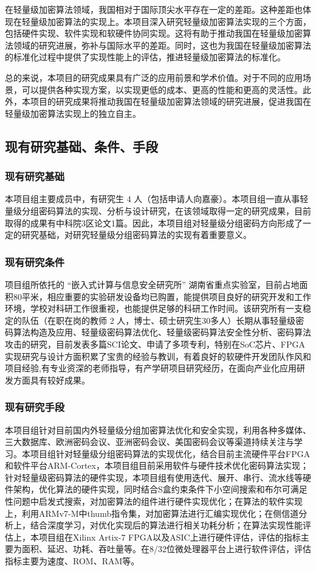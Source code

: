 \documentclass{ctexart}
\begin{document}
在轻量级加密算法领域，我国相对于国际顶尖水平存在一定的差距。这种差距也体现在轻量级加密算法的实现上。本项目深入研究轻量级加密算法实现的三个方面，包括硬件实现、软件实现和软硬件协同实现。这将有助于推动我国在轻量级加密算法领域的研究进展，弥补与国际水平的差距。同时，这也为我国在轻量级加密算法的标准化过程中提供了实现性能上的评估，推进轻量级加密算法的标准化。

总的来说，本项目的研究成果具有广泛的应用前景和学术价值。对于不同的应用场景，可以提供各种实现方案，以实现更低的成本、更高的性能和更高的灵活性。此外，本项目的研究成果将推动我国在轻量级加密算法领域的研究进展，促进我国在轻量级加密算法实现上的独立自主。

\subsection{现有研究基础、条件、手段}
\subsubsection{现有研究基础}
本项目组主要成员中，有研究生 4 人（包括申请人向嘉豪）。本项目组一直从事轻量级分组密码算法的实现、分析与设计研究，在该领域取得一定的研究成果，目前取得的成果有中科院3区论文1篇。因此，本项目组对轻量级分组密码方向形成了一定的研究基础，对研究轻量级分组密码算法的实现有着重要意义。
\subsubsection{现有研究条件}
项目组所依托的 “嵌入式计算与信息安全研究所” 湖南省重点实验室，目前占地面积80平米，相应重要的实验研发设备均已购置，能提供项目良好的研究开发和工作环境，学校对科研工作很重视，也能提供足够的科研工作时间。该研究所有一支稳定的队伍（在职在岗的教师 2 人，博士、硕士研究生30多人）长期从事轻量级密码算法构造及应用、轻量级密码算法优化、轻量级密码算法安全性分析、密码算法攻击的研究，目前发表多篇SCI论文、申请了多项专利，特别在SoC芯片、FPGA实现研究与设计方面积累了宝贵的经验与教训，有着良好的软硬件开发团队作风和项目经验,有专业资深的老师指导，有产学研项目研究经历，在面向产业化应用研发方面具有较好成果。

\subsubsection{现有研究手段}

本项目组针对目前国内外轻量级分组加密算法优化和安全实现，利用各种多媒体、三大数据库、欧洲密码会议、亚洲密码会议、美国密码会议等渠道持续关注与学习。本项目组针对轻量级分组密码算法的实现优化，结合目前主流硬件平台FPGA和软件平台ARM-Cortex，本项目组目前采用软件与硬件技术优化密码算法实现；针对轻量级密码算法的硬件实现，本项目组有使用迭代、展开、串行、流水线等硬件架构，优化算法的硬件实现，同时结合S盒约束条件下小空间搜索和布尔可满足性问题中启发式搜索，对加密算法的组件进行硬件实现优化；在算法的软件实现上，利用ARMv7-M中thumb指令集，对加密算法进行汇编实现优化；在侧信道分析上，结合深度学习，对优化实现后的算法进行相关功耗分析；在算法实现性能评估上，本项目组在Xilinx Artix-7 FPGA以及ASIC上进行硬件评估，评估的指标主要为面积、延迟、功耗、吞吐量等。在8/32位微处理器平台上进行软件评估，评估指标主要为速度、ROM、RAM等。
\end{document}
